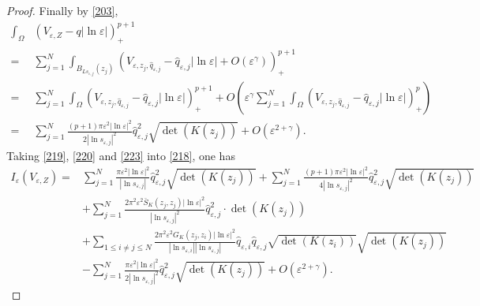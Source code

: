 \documentclass[12pt,reqno]{amsart}
\numberwithin{equation}{section}
\theoremstyle{definition}
\theoremstyle{remark}
\begin{document}
\begin{proof}
Finally by \eqref{203},
\begin{equation}\label{223}
\begin{split}
\int_{\Omega}&\left (V_{\varepsilon,Z}-q|\ln\varepsilon|\right )^{p+1}_+\\
=&\sum_{j=1}^N\int_{B_{Ls_{\varepsilon,j}}(z_j)}\left( V_{\varepsilon, z_j, \hat{q}_{\varepsilon,j}}-\hat{q}_{\varepsilon,j}|\ln\varepsilon|+O\left(  \varepsilon^\gamma \right) \right)^{p+1}_+\\
=&\sum_{j=1}^N\int_{\Omega}\left (V_{\varepsilon, z_j, \hat{q}_{\varepsilon,j}}-\hat{q}_{\varepsilon,j}|\ln\varepsilon|\right )^{p+1}_++O\left(  \varepsilon^\gamma \sum_{j=1}^N\int_{\Omega}\left (V_{\varepsilon, z_j, \hat{q}_{\varepsilon,j}}-\hat{q}_{\varepsilon,j}|\ln\varepsilon|\right )^{p}_+\right) \\
=&\sum_{j=1}^N\frac{(p+1)\pi\varepsilon^2|\ln\varepsilon|^2}{2 |\ln s_{\varepsilon,j}|^2}\hat{q}_{\varepsilon,j}^2\sqrt{\det(K(z_j))}+O\left( \varepsilon^{2+\gamma} \right).
\end{split}
\end{equation}
Taking \eqref{219}, \eqref{220} and \eqref{223} into \eqref{218}, one has
\begin{equation}\label{225}
\begin{split}
I_\varepsilon(V_{\varepsilon,Z})=&\sum_{j=1}^N\frac{\pi\varepsilon^2|\ln\varepsilon|^2}{|\ln s_{\varepsilon,j}|}\hat{q}_{\varepsilon,j}^2\sqrt{\det(K(z_j))}+\sum_{j=1}^N\frac{(p+1)\pi\varepsilon^2|\ln\varepsilon|^2}{4 |\ln s_{\varepsilon,j}|^2}\hat{q}_{\varepsilon,j}^2\sqrt{\det(K(z_j))}\\
&+\sum_{j=1}^N\frac{2\pi^2\varepsilon^2 \bar{S}_K(z_j,z_j)|\ln\varepsilon|^2}{|\ln s_{\varepsilon,j}|^2}\hat{q}_{\varepsilon,j}^2\cdot \det(K(z_j))\\
&+\sum_{1\leq i\neq j\leq N}\frac{2\pi^2\varepsilon^2G_K(z_j,z_i)|\ln\varepsilon|^2}{|\ln s_{\varepsilon,i}||\ln s_{\varepsilon,j}|}\hat{q}_{\varepsilon,i}\hat{q}_{\varepsilon,j}\sqrt{\det(K(z_i))}\sqrt{\det(K(z_j))}\\
&-\sum_{j=1}^N\frac{\pi\varepsilon^2|\ln\varepsilon|^2}{2 |\ln s_{\varepsilon,j}|^2}\hat{q}_{\varepsilon,j}^2\sqrt{\det(K(z_j))}+O\left( \varepsilon^{2+\gamma} \right).
\end{split}
\end{equation}

\end{proof}
\end{document}
